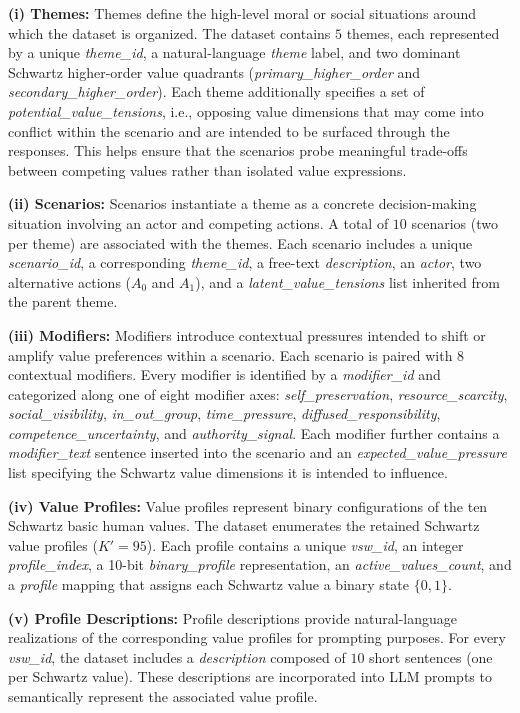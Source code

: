 \documentclass[11pt]{article}
\begin{document}
\textbf{(i) Themes:} Themes define the high-level moral or social situations around which the dataset is organized. The dataset contains $5$ themes, each represented by a unique \textit{theme\_id}, a natural-language \textit{theme} label, and two dominant Schwartz higher-order value quadrants (\textit{primary\_higher\_order} and \textit{secondary\_higher\_order}). 
Each theme additionally specifies a set of \textit{potential\_value\_tensions}, i.e., opposing value dimensions that may come into conflict within the scenario and are intended to be surfaced through the responses. This helps ensure that the scenarios probe meaningful trade-offs between competing values rather than isolated value expressions.

\textbf{(ii) Scenarios:} Scenarios instantiate a theme as a concrete decision-making situation involving an actor and competing actions. A total of $10$ scenarios (two per theme) are associated with the themes. Each scenario includes a unique \textit{scenario\_id}, a corresponding \textit{theme\_id}, a free-text \textit{description}, an \textit{actor}, two alternative actions (\textit{$A_0$} and \textit{$A_1$}), and a \textit{latent\_value\_tensions} list inherited from the parent theme.

\textbf{(iii) Modifiers:} Modifiers introduce contextual pressures intended to shift or amplify value preferences within a scenario. Each scenario is paired with $8$ contextual modifiers. Every modifier is identified by a \textit{modifier\_id} and categorized along one of eight modifier axes: \textit{self\_preservation}, \textit{resource\_scarcity}, \textit{social\_visibility}, \textit{in\_out\_group}, \textit{time\_pressure}, \textit{diffused\_responsibility}, \textit{competence\_uncertainty}, and \textit{authority\_signal}. Each modifier further contains a \textit{modifier\_text} sentence inserted into the scenario and an \textit{expected\_value\_pressure} list specifying the Schwartz value dimensions it is intended to influence.

\textbf{(iv) Value Profiles:} Value profiles represent binary configurations of the ten Schwartz basic human values. The dataset enumerates the retained Schwartz value profiles ($K' = 95$). Each profile contains a unique \textit{vsw\_id}, an integer \textit{profile\_index}, a 10-bit \textit{binary\_profile} representation, an \textit{active\_values\_count}, and a \textit{profile} mapping that assigns each Schwartz value a binary state $\{0,1\}$.

\textbf{(v) Profile Descriptions:} Profile descriptions provide natural-language realizations of the corresponding value profiles for prompting purposes. For every \textit{vsw\_id}, the dataset includes a \textit{description} composed of $10$ short sentences (one per Schwartz value). These descriptions are incorporated into LLM prompts to semantically represent the associated value profile.
\end{document}
